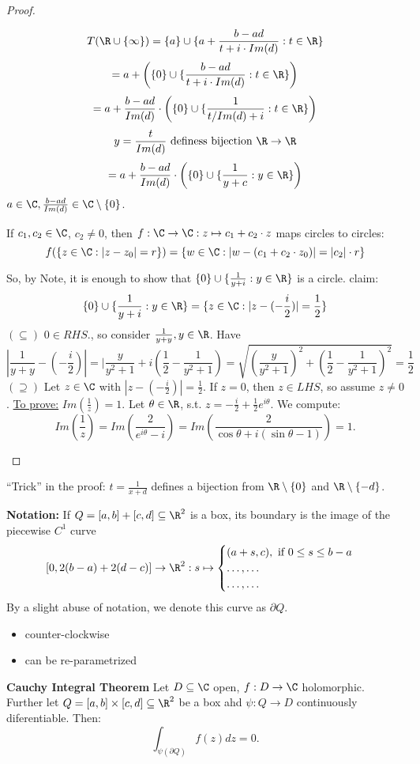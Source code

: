 \begin{proof}
\begin{enumerate}[Case (1)]
    $$T(\R\cup\{\infty\})=\{a\}\cup\{a+\frac{b-ad}{t+i \cdot Im(d)}: t\in \R\}$$
    $$=a+\left(\{0\}\cup\{\frac{b-ad}{t+i \cdot Im(d)}: t\in \R\}\right)$$
    $$=a+\frac{b-ad}{Im(d)} \cdot \left(\{0\}\cup\{\frac{1}{t/Im(d)+i}:t\in \R\}\right)$$
    $$y=\frac{t}{Im(d)} \text{ definess bijection }\R\to\R$$
    $$=a+\frac{b-ad}{Im(d)} \cdot \left(\{0\}\cup \{\frac{1}{y+c}:y\in\R\}\right)$$
    $a\in \C, \frac{b-ad}{Im(d)}\in \C\setminus\{0\}$.
    \begin{note}
      If $c_1,c_2\in \C$, $c_2\neq 0$, then $f:\C\to\C:z\mapsto c_1+c_2 \cdot z$ maps circles to circles:
        $$f(\{z\in\C: |z-z_0|=r\})=\{w\in \C:|w-(c_1+c_2 \cdot z_0)|=|c_2| \cdot r\}$$
    \end{note}
    So, by Note,  it is enough to show that $\{0\}\cup\{\frac{1}{y+i}:y\in\R\}$ is a circle.
    claim:
      $$\{0\}\cup\{\frac{1}{y+i}:y\in\R\}=\{z\in\C:|z-(-\frac{i}{2})|=\frac{1}{2}\}$$
    $(\subseteq)$ $0\in RHS.$, so consider $\frac{1}{y+y},y\in \R$. Have $$|\frac{1}{y+y}-(-\frac{i}{2})|=|\frac{y}{y^2+1}+i \left(\frac{1}{2}-\frac{1}{y^2+1}\right)=\sqrt{\left(\frac{y}{y^2+1}\right)^2+\left(\frac{1}{2}-\frac{1}{y^2+1}\right)^2}=\frac{1}{2}$$
    $(\supseteq)$ Let $z\in \C$ with $|z-(-\frac{i}{2})|=\frac{1}{2}$. If $z=0$, then $z\in LHS$, so assume $z\neq 0$.
    \newline \underline{To prove:} $Im(\frac{1}{z})=1$.
    \newline Let $\theta\in\R$, s.t. $z=-\frac{i}{2}+\frac{1}{2}e^{i\theta}$. We compute: $$Im\left(\frac{1}{z}\right)=Im\left(\frac{2}{e^{i\theta}-i}\right)=Im \left(\frac{2}{\cos \theta+i(\sin \theta -1)}\right)=1.$$
\end{enumerate}
\qedhere
\end{proof}
\begin{remark}
  ``Trick'' in the proof: $t=\frac{1}{x+d}$ defines a bijection from $\R\setminus\{0\}$ and $\R\setminus\{-d\}$.
\end{remark}

\textbf{Notation:} If $Q=[a,b]+[c,d] \subseteq \R^2$ is a box, its boundary is the image of the piecewise $C^1$ curve
  $$[0,2(b-a)+2(d-c)]\to \R^2: s\mapsto
    \begin{cases}
      (a+s,c), \text{ if }0\leq s \leq b-a \\
      \dots , \dots \\
      \dots, \dots
    \end{cases}
  $$
By a slight abuse of notation, we denote this curve as $\partial Q$.
  \begin{itemize}
    \item counter-clockwise
    \item can be re-parametrized
  \end{itemize}
\begin{theorem}
  \textbf{Cauchy Integral Theorem}
  \newline Let $D\subseteq \C$ open, $f:D\to \C$ holomorphic. Further let $Q=[a,b]\times [c,d]\subseteq \R^2$ be a box ahd $\psi:Q\to D$ continuously diferentiable. Then:
     $$\int_{\psi(\partial Q)}^{}f(z)dz=0.$$
\end{theorem}

